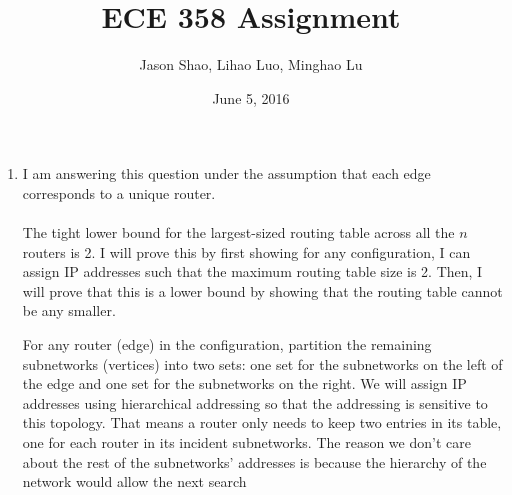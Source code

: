 \documentclass[12pt]{article}
\title{ECE 358 Assignment }
\author{Jason Shao, Lihao Luo, Minghao Lu}
\date{June 5, 2016}
\begin{document}
\maketitle
\renewcommand{\thesubsection}{Problem \arabic{subsection}}


\def\question#1{\item[\bf #1.]}
\def\part#1{\item[\bf #1)]}
\newcommand{\pc}[1]{\mbox{\textbf{#1}}} %

\begin{enumerate}
    \item I am answering this question under the assumption that each edge corresponds to a unique router. \\ \\The tight lower bound for the largest-sized routing table across all the $n$ routers is 2. I will prove this by first showing for any configuration, I can assign IP addresses such that the maximum routing table size is 2. Then, I will prove that this is a lower bound by showing that the routing table cannot be any smaller. 
    
	For any router (edge) in the configuration, partition the remaining subnetworks (vertices) into two sets: one set for the subnetworks on the left of the edge and one set for the subnetworks on the right. We will assign IP addresses using  hierarchical addressing so that the addressing is sensitive to this topology. That means a router only needs to keep two entries in its table, one for each router in its incident subnetworks. The reason we don't care about the rest of the subnetworks' addresses is because the hierarchy of the network would allow the next search
    

\end{enumerate}
\end{document}
